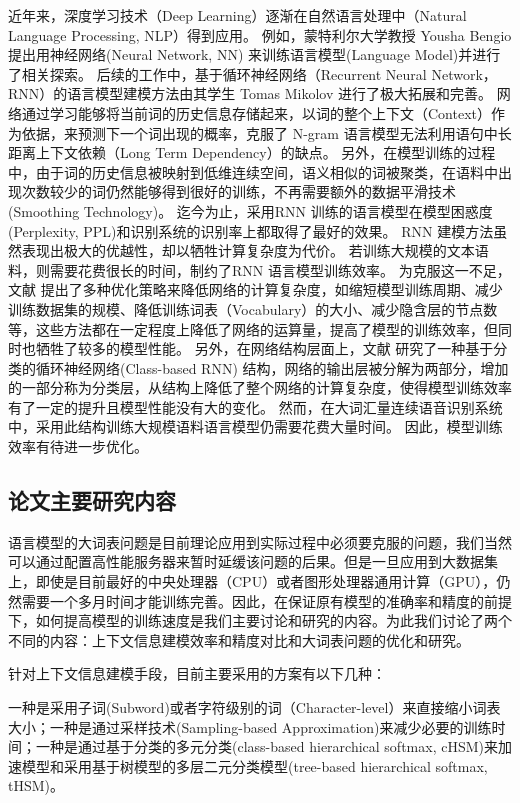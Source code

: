 \documentclass[master,openright,twoside,color]{buaathesis}
\begin{document}
近年来，深度学习技术（Deep Learning）逐渐在自然语言处理中（Natural Language Processing, NLP）得到应用。 例如，蒙特利尔大学教授 Yousha Bengio 提出用神经网络(Neural Network, NN) 来训练语言模型(Language Model)并进行了相关探索\cite{DBLP:conf/nips/BengioDV00}。 后续的工作中，基于循环神经网络（Recurrent Neural Network， RNN）的语言模型建模方法由其学生 Tomas Mikolov 进行了极大拓展和完善\cite{DBLP:conf/interspeech/MikolovKBCK10}。 网络通过学习能够将当前词的历史信息存储起来，以词的整个上下文（Context）作为依据，来预测下一个词出现的概率，克服了 N-gram 语言模型无法利用语句中长距离上下文依赖（Long Term Dependency）的缺点。 另外，在模型训练的过程中，由于词的历史信息被映射到低维连续空间，语义相似的词被聚类，在语料中出现次数较少的词仍然能够得到很好的训练，不再需要额外的数据平滑技术(Smoothing Technology)。
迄今为止，采用RNN 训练的语言模型在模型困惑度(Perplexity, PPL)和识别系统的识别率上都取得了最好的效果。 RNN 建模方法虽然表现出极大的优越性，却以牺牲计算复杂度为代价。 若训练大规模的文本语料，则需要花费很长的时间，制约了RNN 语言模型训练效率。 为克服这一不足，文献 \cite{DBLP:conf/icassp/MikolovKBCK11} 提出了多种优化策略来降低网络的计算复杂度，如缩短模型训练周期、减少训练数据集的规模、降低训练词表（Vocabulary）的大小、减少隐含层的节点数等，这些方法都在一定程度上降低了网络的运算量，提高了模型的训练效率，但同时也牺牲了较多的模型性能。 另外，在网络结构层面上，文献\cite{DBLP:journals/coling/BrownPdLM92} 研究了一种基于分类的循环神经网络(Class-based RNN) 结构，网络的输出层被分解为两部分，增加的一部分称为分类层，从结构上降低了整个网络的计算复杂度，使得模型训练效率有了一定的提升且模型性能没有大的变化。 然而，在大词汇量连续语音识别系统中，采用此结构训练大规模语料语言模型仍需要花费大量时间。 因此，模型训练效率有待进一步优化。

\subsection{论文主要研究内容}
语言模型的大词表问题是目前理论应用到实际过程中必须要克服的问题，我们当然可以通过配置高性能服务器来暂时延缓该问题的后果。但是一旦应用到大数据集上，即使是目前最好的中央处理器（CPU）或者图形处理器通用计算（GPU），仍然需要一个多月时间才能训练完善。因此，在保证原有模型的准确率和精度的前提下，如何提高模型的训练速度是我们主要讨论和研究的内容。为此我们讨论了两个不同的内容：上下文信息建模效率和精度对比和大词表问题的优化和研究。

针对上下文信息建模手段，目前主要采用的方案有以下几种：

一种是采用子词(Subword)或者字符级别的词（Character-level）来直接缩小词表大小；一种是通过采样技术(Sampling-based Approximation)来减少必要的训练时间；一种是通过基于分类的多元分类(class-based hierarchical softmax, cHSM)来加速模型和采用基于树模型的多层二元分类模型(tree-based hierarchical softmax, tHSM)。
\end{document}
